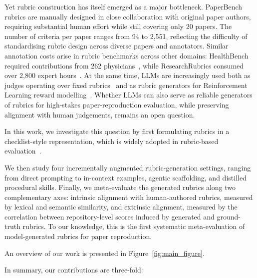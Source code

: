 \documentclass[11pt]{article}
\newif\ifreview
\newcommand{\hh}[1]{%
\ifreview
{\textcolor{orange!90!black}{#1}}
\else
#1
\fi
}
\begin{document}
Yet rubric construction has itself emerged as a major bottleneck. PaperBench rubrics are manually designed in close collaboration with original paper authors, requiring substantial human effort while still covering only 20 papers. The number of criteria per paper ranges from 94 to 2{,}551, reflecting the difficulty of standardising rubric design across diverse papers and annotators. Similar annotation costs arise in rubric benchmarks across other domains: HealthBench required contributions from 262 physicians~\cite{arora2025healthbenchevaluatinglargelanguage}, while ResearchRubrics consumed over 2{,}800 expert hours~\cite{sharma2025researchrubricsbenchmarkpromptsrubrics}. At the same time, LLMs are increasingly used both as judges operating over fixed rubrics~\cite{zheng2023judging,gu2025surveyllmasajudge} and as rubric generators for Reinforcement Learning reward modelling~\cite{gunjal2026rubrics}. Whether LLMs can also serve as reliable generators of rubrics for high-stakes paper-reproduction evaluation, while preserving alignment with human judgements, remains an open question.

\hh{In this work, we investigate this question by first formulating rubrics in a checklist-style representation, which is widely adopted in rubric-based evaluation~\cite{sharma2025researchrubricsbenchmarkpromptsrubrics,arora2025healthbenchevaluatinglargelanguage,wang2025profbenchmultidomainrubricsrequiring}.} We then study four incrementally augmented rubric-generation settings, ranging from direct prompting to in-context examples, agentic scaffolding, and distilled procedural skills. Finally, we meta-evaluate the generated rubrics along two complementary axes: intrinsic alignment with human-authored rubrics, measured by lexical and semantic similarity, and extrinsic alignment, measured by the correlation between repository-level scores induced by generated and ground-truth rubrics. To our knowledge, this is the first systematic meta-evaluation of model-generated rubrics for paper reproduction. \hh{An overview of our work is presented in Figure~\ref{fig:main_figure}.}

In summary, our contributions are three-fold:
\end{document}
